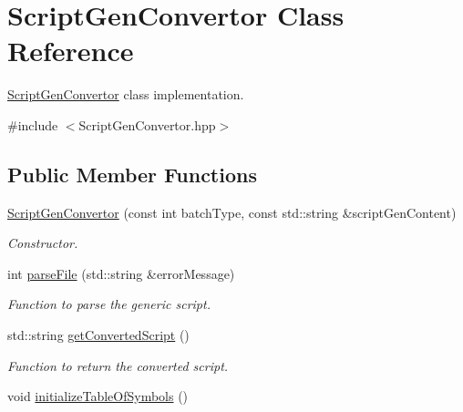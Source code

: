 \hypertarget{classScriptGenConvertor}{
\section{ScriptGenConvertor Class Reference}
\label{classScriptGenConvertor}
}


\hyperlink{classScriptGenConvertor}{ScriptGenConvertor} class implementation.  




{\ttfamily \#include $<$ScriptGenConvertor.hpp$>$}

\subsection*{Public Member Functions}
\begin{DoxyCompactItemize}
\item 
\hyperlink{classScriptGenConvertor_a4aa6af3a71aef7772404c78e95472214}{ScriptGenConvertor} (const int batchType, const std::string \&scriptGenContent)
\begin{DoxyCompactList}\small\item\em Constructor. \item\end{DoxyCompactList}\item 
int \hyperlink{classScriptGenConvertor_a6627150950cbb725e5a0de1db73db85e}{parseFile} (std::string \&errorMessage)
\begin{DoxyCompactList}\small\item\em Function to parse the generic script. \item\end{DoxyCompactList}\item 
\hypertarget{classScriptGenConvertor_ac23bd6bcfdf1bb6fe0f7a4e4c3b08e10}{
std::string \hyperlink{classScriptGenConvertor_ac23bd6bcfdf1bb6fe0f7a4e4c3b08e10}{getConvertedScript} ()}
\label{classScriptGenConvertor_ac23bd6bcfdf1bb6fe0f7a4e4c3b08e10}

\begin{DoxyCompactList}\small\item\em Function to return the converted script. \item\end{DoxyCompactList}\item 
\hypertarget{classScriptGenConvertor_a85291a2b67f069ae5b03c3dafa0c2dde}{
void \hyperlink{classScriptGenConvertor_a85291a2b67f069ae5b03c3dafa0c2dde}{initializeTableOfSymbols} ()}
\label{classScriptGenConvertor_a85291a2b67f069ae5b03c3dafa0c2dde}


\end{DoxyCompactItemize}
